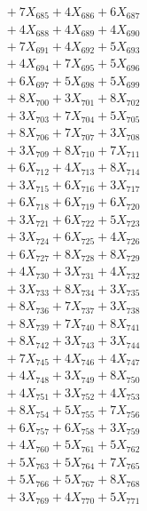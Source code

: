 \documentclass[a4paper,10pt]{article}
\begin{document}
{\begin{align}
&\;  + 7 X_{685} + 4 X_{686} + 6 X_{687} \\[0.3ex]
&\;  + 4 X_{688} + 4 X_{689} + 4 X_{690} \\[0.3ex]
&\;  + 7 X_{691} + 4 X_{692} + 5 X_{693} \\[0.3ex]
&\;  + 4 X_{694} + 7 X_{695} + 5 X_{696} \\[0.3ex]
&\;  + 6 X_{697} + 5 X_{698} + 5 X_{699} \\[0.5ex]\allowbreak
&\;  + 8 X_{700} + 3 X_{701} + 8 X_{702} \\[0.3ex]
&\;  + 3 X_{703} + 7 X_{704} + 5 X_{705} \\[0.3ex]
&\;  + 8 X_{706} + 7 X_{707} + 3 X_{708} \\[0.3ex]
&\;  + 3 X_{709} + 8 X_{710} + 7 X_{711} \\[0.3ex]
&\;  + 6 X_{712} + 4 X_{713} + 8 X_{714} \\[0.3ex]
&\;  + 3 X_{715} + 6 X_{716} + 3 X_{717} \\[0.3ex]
&\;  + 6 X_{718} + 6 X_{719} + 6 X_{720} \\[0.3ex]
&\;  + 3 X_{721} + 6 X_{722} + 5 X_{723} \\[0.3ex]
&\;  + 3 X_{724} + 6 X_{725} + 4 X_{726} \\[0.3ex]
&\;  + 6 X_{727} + 8 X_{728} + 8 X_{729} \\[0.5ex]\allowbreak
&\;  + 4 X_{730} + 3 X_{731} + 4 X_{732} \\[0.3ex]
&\;  + 3 X_{733} + 8 X_{734} + 3 X_{735} \\[0.3ex]
&\;  + 8 X_{736} + 7 X_{737} + 3 X_{738} \\[0.3ex]
&\;  + 8 X_{739} + 7 X_{740} + 8 X_{741} \\[0.3ex]
&\;  + 8 X_{742} + 3 X_{743} + 3 X_{744} \\[0.3ex]
&\;  + 7 X_{745} + 4 X_{746} + 4 X_{747} \\[0.3ex]
&\;  + 4 X_{748} + 3 X_{749} + 8 X_{750} \\[0.3ex]
&\;  + 4 X_{751} + 3 X_{752} + 4 X_{753} \\[0.3ex]
&\;  + 8 X_{754} + 5 X_{755} + 7 X_{756} \\[0.3ex]
&\;  + 6 X_{757} + 6 X_{758} + 3 X_{759} \\[0.5ex]\allowbreak
&\;  + 4 X_{760} + 5 X_{761} + 5 X_{762} \\[0.3ex]
&\;  + 5 X_{763} + 5 X_{764} + 7 X_{765} \\[0.3ex]
&\;  + 5 X_{766} + 5 X_{767} + 8 X_{768} \\[0.3ex]
&\;  + 3 X_{769} + 4 X_{770} + 5 X_{771} \\[0.3ex]

\end{align}}
\end{document}
